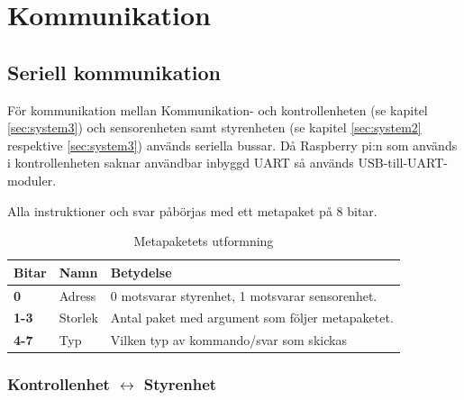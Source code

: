 \documentclass[a4paper,11pt]{article}
\begin{document}
\clearpage
\section{Kommunikation}
\label{ssec:communication}

\subsection{Seriell kommunikation}
För kommunikation mellan Kommunikation- och kontrollenheten (se kapitel \ref{sec:system3}) och sensorenheten samt styrenheten (se kapitel \ref{sec:system2} respektive \ref{sec:system3}) används seriella bussar. Då Raspberry pi:n som används i kontrollenheten saknar användbar inbyggd UART så används USB-till-UART-moduler.

Alla instruktioner och svar påbörjas med ett metapaket på 8 bitar.
\begin{table}[h]
    \centering
    \begin{tabular}{|l|l|l|}
        \hline
        Bitar        & Namn    & Betydelse                                        \\ \hline
        \textbf{0}   & Adress  & 0 motsvarar styrenhet, 1 motsvarar sensorenhet.  \\
        \textbf{1-3} & Storlek & Antal paket med argument som följer metapaketet. \\
        \textbf{4-7} & Typ     & Vilken typ av kommando/svar som skickas          \\ \hline
    \end{tabular}
    \caption{Metapaketets utformning}
\end{table}


\subsubsection{Kontrollenhet $\leftrightarrow$ Styrenhet}
\end{document}
